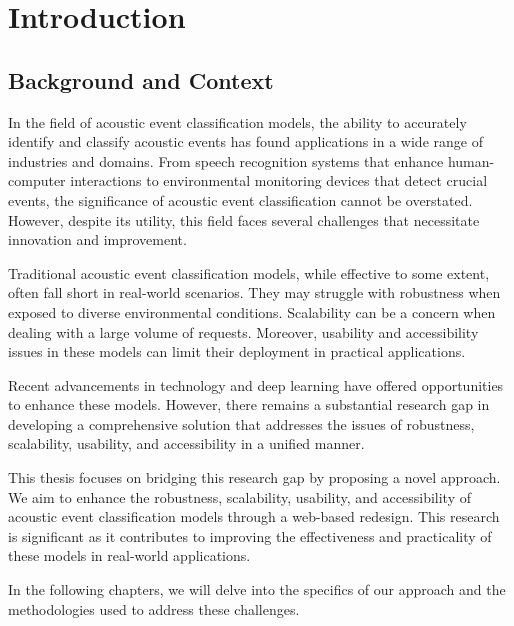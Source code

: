 \chapter{Introduction}
\setcounter{page}{1}

\section{Background and Context}

In the field of acoustic event classification models, the ability to accurately identify and classify acoustic events has found applications in a wide range of industries and domains\cite{SHARAN201724}. From speech recognition systems that enhance human-computer interactions\cite{6857341} to environmental monitoring devices that detect crucial events\cite{sampath2020low}\cite{KHF17_Acoustic_Event_Classification_Using_Convolutional_Neural_Networks}, the significance of acoustic event classification cannot be overstated. However, despite its utility, this field faces several challenges that necessitate innovation and improvement.

Traditional acoustic event classification models, while effective to some extent, often fall short in real-world scenarios. They may struggle with robustness when exposed to diverse environmental conditions. Scalability can be a concern when dealing with a large volume of requests. Moreover, usability and accessibility issues in these models can limit their deployment in practical applications\cite{sampath2019realtime}.

Recent advancements in technology and deep learning have offered opportunities to enhance these models. However, there remains a substantial research gap in developing a comprehensive solution that addresses the issues of robustness, scalability, usability, and accessibility in a unified manner.

This thesis focuses on bridging this research gap by proposing a novel approach. We aim to enhance the robustness, scalability, usability, and accessibility of acoustic event classification models through a web-based redesign. This research is significant as it contributes to improving the effectiveness and practicality of these models in real-world applications.

In the following chapters, we will delve into the specifics of our approach and the methodologies used to address these challenges.

